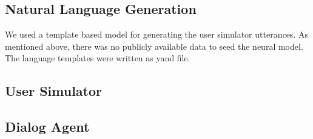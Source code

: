 \subsection{ Natural Language Generation}

We used a template based model for generating the user simulator utterances. As mentioned above, there was no publicly available data to seed the neural model. The language templates were written as yaml file.




\subsection{User Simulator}



\subsection{Dialog Agent}



